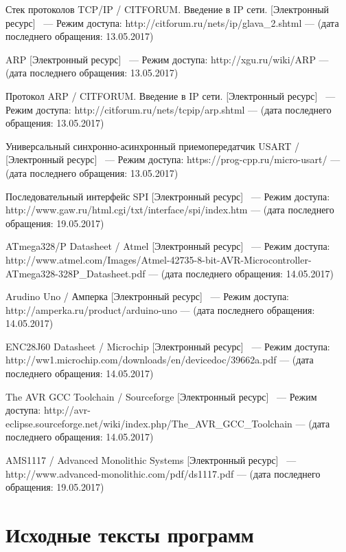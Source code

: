 \documentclass[utf8x,14pt, coursreport]{G7-32}
\begin{document}
\begin{thebibliography}{99}
 Стек протоколов TCP/IP / CITFORUM. Введение в IP сети. [Электронный ресурс] ~--- Режим доступа: http://citforum.ru/nets/ip/glava\_2.shtml --- (дата последнего обращения: 13.05.2017)

 ARP [Электронный ресурс] ~--- Режим доступа: http://xgu.ru/wiki/ARP --- (дата последнего обращения: 13.05.2017)

  Протокол ARP  / CITFORUM. Введение в IP сети. [Электронный ресурс] ~--- Режим доступа: http://citforum.ru/nets/tcpip/arp.shtml --- (дата последнего обращения: 13.05.2017)

 Универсальный синхронно-асинхронный приемопередатчик USART / [Электронный ресурс] ~--- Режим доступа: https://prog-cpp.ru/micro-usart/ --- (дата последнего обращения: 13.05.2017)

 Последовательный интерфейс SPI [Электронный ресурс] ~--- Режим доступа: http://www.gaw.ru/html.cgi/txt/interface/spi/index.htm --- (дата последнего обращения: 19.05.2017)

 ATmega328/P Datasheet / Atmel [Электронный ресурс] ~--- Режим доступа: http://www.atmel.com/Images/Atmel-42735-8-bit-AVR-Microcontroller-ATmega328-328P\_Datasheet.pdf --- (дата последнего обращения: 14.05.2017)

 Arudino Uno / Амперка [Электронный ресурс] ~--- Режим доступа: http://amperka.ru/product/arduino-uno --- (дата последнего обращения: 14.05.2017)

 ENC28J60 Datasheet / Microchip  [Электронный ресурс] ~--- Режим доступа: http://ww1.microchip.com/downloads/en/devicedoc/39662a.pdf --- (дата последнего обращения: 14.05.2017)

 The AVR GCC Toolchain / Sourceforge [Электронный ресурс] ~--- Режим доступа: http://avr-eclipse.sourceforge.net/wiki/index.php/The\_AVR\_GCC\_Toolchain --- (дата последнего обращения: 14.05.2017)

 AMS1117 / Advanced Monolithic Systems [Электронный ресурс] ~--- http://www.advanced-monolithic.com/pdf/ds1117.pdf --- (дата последнего обращения: 19.05.2017)

\end{thebibliography}


\appendix

\chapter{Исходные тексты программ}

\small{}

\end{document}
